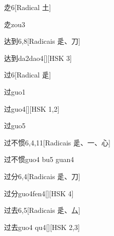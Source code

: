 \begin{entry}{赱}{6}[Radical ⼟]
  \begin{phonetics}{赱}{zou3}
  \end{phonetics}
\end{entry}

\begin{entry}{达到}{6,8}[Radicais ⾡、⼑]
  \begin{phonetics}{达到}{da2dao4}[][HSK 3]
  \end{phonetics}
\end{entry}

\begin{entry}{过}{6}[Radical ⾡]
  \begin{phonetics}{过}{guo1}
  \end{phonetics}
  \begin{phonetics}{过}{guo4}[][HSK 1,2]
  \end{phonetics}
  \begin{phonetics}{过}{guo5}
  \end{phonetics}
\end{entry}

\begin{entry}{过不惯}{6,4,11}[Radicais ⾡、⼀、⼼]
  \begin{phonetics}{过不惯}{guo4 bu5 guan4}
  \end{phonetics}
\end{entry}

\begin{entry}{过分}{6,4}[Radicais ⾡、⼑]
  \begin{phonetics}{过分}{guo4fen4}[][HSK 4]
  \end{phonetics}
\end{entry}

\begin{entry}{过去}{6,5}[Radicais ⾡、⼛]
  \begin{phonetics}{过去}{guo4 qu4}[][HSK 2,3]
  \end{phonetics}
\end{entry}


